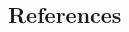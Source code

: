 \documentclass[twoside]{article}
\begin{document}
\begin{multicols}{2}
\section{References}

\begin{spacing}{0.9}
	
%
\begingroup
\renewcommand{\section}[2]{}%

\endgroup
\end{spacing}

\end{multicols}
\end{document}
